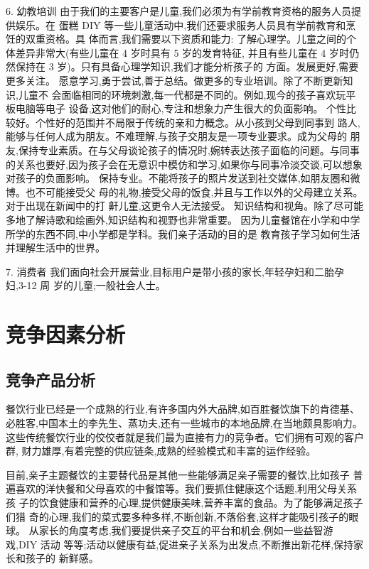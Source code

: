 6. 幼教培训
由于我们的主要客户是儿童,我们必须为有学前教育资格的服务人员提供娱乐。在
蛋糕 DIY 等一些儿童活动中,我们还要求服务人员具有学前教育和烹饪的双重资格。具
体而言,我们需要以下资质和能力:
了解心理学。儿童之间的个体差异非常大(有些儿童在 4 岁时具有 5 岁的发育特征,
并且有些儿童在 4 岁时仍然保持在 3 岁)。只有具备心理学知识,我们才能分析孩子的
方面。发展更好,需要更多关注。
愿意学习,勇于尝试,善于总结。做更多的专业培训。除了不断更新知识,儿童不
会面临相同的环境刺激,每一代都是不同的。例如,现今的孩子喜欢玩平板电脑等电子
设备,这对他们的耐心,专注和想象力产生很大的负面影响。
个性比较好。个性好的范围并不局限于传统的亲和力概念。从小孩到父母到同事到
路人,能够与任何人成为朋友。不难理解,与孩子交朋友是一项专业要求。成为父母的
朋友,保持专业素质。在与父母谈论孩子的情况时,婉转表达孩子面临的问题。与同事
的关系也要好,因为孩子会在无意识中模仿和学习,如果你与同事冷淡交谈,可以想象
对孩子的负面影响。
保持专业。不能将孩子的照片发送到社交媒体,如朋友圈和微博。也不可能接受父
母的礼物,接受父母的饭食,并且与工作以外的父母建立关系。对于出现在新闻中的打
鼾儿童,这更令人无法接受。
知识结构和视角。除了尽可能多地了解诗歌和绘画外,知识结构和视野也非常重要。
因为儿童餐馆在小学和中学所学的东西不同,中小学都是学科。我们亲子活动的目的是
教育孩子学习如何生活并理解生活中的世界。

7. 消费者
我们面向社会开展营业,目标用户是带小孩的家长,年轻孕妇和二胎孕妇,3-12 周
岁的儿童;一般社会人士。

\section{竞争因素分析}

\subsection{竞争产品分析}
餐饮行业已经是一个成熟的行业,有许多国内外大品牌,如百胜餐饮旗下的肯德基、
必胜客,中国本土的李先生、蒸功夫,还有一些城市的本地品牌,在当地颇具影响力。
这些传统餐饮行业的佼佼者就是我们最为直接有力的竞争者。它们拥有可观的客户群,
财力雄厚,有着完整的供应链条,成熟的经验模式和丰富的运作经验。

目前,亲子主题餐饮的主要替代品是其他一些能够满足亲子需要的餐饮,比如孩子
普遍喜欢的洋快餐和父母喜欢的中餐馆等。我们要抓住健康这个话题,利用父母关系孩
子的饮食健康和营养的心理,提供健康美味,营养丰富的食品。为了能够满足孩子们猎
奇的心理,我们的菜式要多种多样,不断创新,不落俗套,这样才能吸引孩子的眼球。
从家长的角度考虑,我们要提供亲子交互的平台和机会,例如一些益智游戏,DIY 活动
等等;活动以健康有益,促进亲子关系为出发点,不断推出新花样,保持家长和孩子的
新鲜感。


